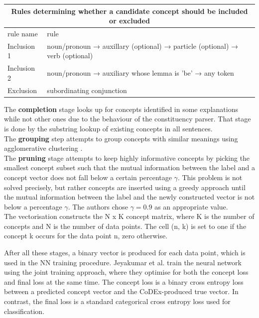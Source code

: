 \begin{center}
\begin{tabular}{ |p{2cm}|p{12cm}|  }
 \hline
 \multicolumn{2}{|c|}{Rules determining whether a candidate concept should be included or excluded} \\
 \hline
 rule name & rule \\
 \hline
 Inclusion 1 & noun/pronoun → auxillary (optional) → particle (optional) → verb (optional) \\
 Inclusion 2 & noun/pronoun → auxiliary whose lemma is 'be' → any token \\
 Exclusion & subordinating conjunction \\
 
 \hline
 
\end{tabular}
\label{inclusion-exclusion-rules}
\end{center}

The \textbf{completion} stage looks up for concepts identified in some explanations while not other ones due to the behaviour of the constituency parser.
That stage is done by the substring lookup of existing concepts in all sentences. \\
The \textbf{grouping} step attempts to group concepts with similar meanings using agglomerative clustering \cite{RefWorks:RefID:13-mullner2011modern}.  \\
The \textbf{pruning} stage attempts to keep highly informative concepts by picking the smallest concept subset such that the mutual information \cite{RefWorks:RefID:30-mackay2004information} between the label and a concept vector does not fall below a certain percentage $\gamma$.
This problem is not solved precisely, but rather concepts are inserted using a greedy approach until the mutual information between the label and the newly constructed vector is not below a percentage $\gamma$. The authors chose $\gamma = 0.9$ as an appropriate value. \\
The vectorisation constructs the N x K concept matrix, where K is the number of concepts and N is the number of data points. 
The cell (n, k) is set to one if the concept k occurs for the data point n, zero otherwise.

After all these stages, a binary vector is produced for each data point, which is used in the NN training procedure.
Jeyakumar et al. train the neural network using the joint training approach, where they optimise for both the concept loss and final loss at the same time.
The concept loss is a binary cross entropy loss between a predicted concept vector and the CoDEx-produced true vector. In contrast, the final loss is a standard categorical cross entropy loss used for classification.

